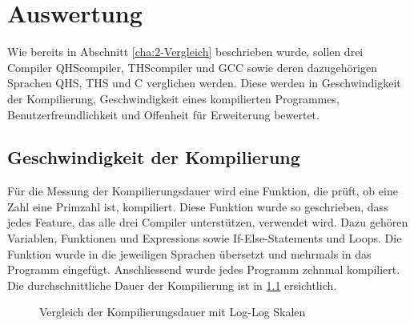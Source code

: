 \chapter{Auswertung}
Wie bereits in Abschnitt \ref{cha:2-Vergleich} beschrieben wurde, sollen drei Compiler QHScompiler, THScompiler und GCC sowie deren dazugehörigen Sprachen QHS, THS und C verglichen werden.
Diese werden in Geschwindigkeit der Kompilierung, Geschwindigkeit eines kompilierten Programmes, Benutzerfreundlichkeit und Offenheit für Erweiterung bewertet. 

\section{Geschwindigkeit der Kompilierung} \label{sec:compare-compilespeed}
Für die Messung der Kompilierungsdauer wird eine Funktion, die prüft, ob eine Zahl eine Primzahl ist, kompiliert. Diese Funktion wurde so geschrieben, dass jedes Feature, das alle drei Compiler unterstützen, verwendet wird.
Dazu gehören Variablen, Funktionen und Expressions sowie If-Else-Statements und Loops. Die Funktion wurde in die jeweiligen Sprachen übersetzt und mehrmals in das Programm eingefügt. Anschliessend wurde jedes Programm zehnmal kompiliert.
Die durchschnittliche Dauer der Kompilierung ist in \ref{fig:compilespeed} ersichtlich.

\begin{figure}[h!]
\centering
\label{fig:compilespeed}
\caption{Vergleich der Kompilierungsdauer mit Log-Log Skalen}
\end{figure}

